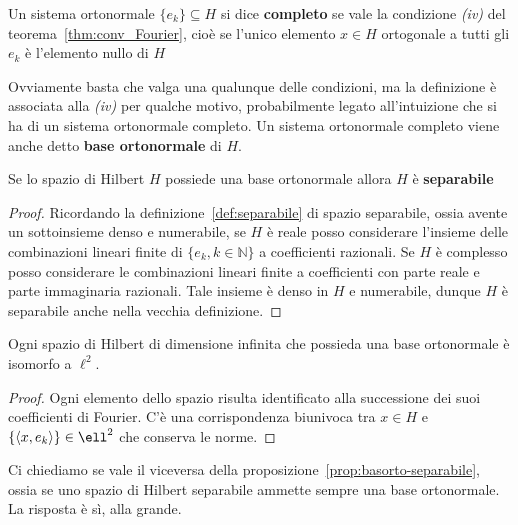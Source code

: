 \begin{definition}
    Un sistema ortonormale \(\{e_{k}\} \subseteq H \) si dice \textbf{completo}
    se vale la condizione \textit{(iv)} del teorema~\ref{thm:conv_Fourier}, cioè
    se l'unico elemento \(x \in H\) ortogonale a tutti gli \(e_{k}\) è
    l'elemento nullo di \(H\) 
\end{definition}
Ovviamente basta che valga una qualunque delle condizioni, ma la definizione è
associata alla \textit{(iv)} per qualche motivo, probabilmente legato all'intuizione 
che si ha di un sistema ortonormale completo. Un sistema ortonormale completo
viene anche detto \textbf{base ortonormale} di \(H\).
\begin{proposition}\label{prop:basorto-separabile}
Se lo spazio di Hilbert \(H\) possiede una base ortonormale allora \(H\) è
\textbf{separabile}
\end{proposition}
\begin{proof}
Ricordando la definizione~\ref{def:separabile} di spazio separabile, ossia
avente un sottoinsieme denso e numerabile, se \(H\) è reale posso considerare
l'insieme delle combinazioni lineari finite di \(\{e_{k}, k \in \mathbb{N}\} \)
a coefficienti razionali. Se \(H\) è complesso posso considerare le combinazioni
lineari finite a coefficienti con parte reale e parte immaginaria razionali.
Tale insieme è denso in \(H\) e numerabile, dunque \(H\) è separabile anche
nella vecchia definizione. %
\end{proof}

\begin{proposition}\label{prop:isomorfol2}
    Ogni spazio di Hilbert di dimensione infinita che possieda una base ortonormale
    è isomorfo a \(\ell^2\). 
\end{proposition}
\begin{proof}
    Ogni elemento dello spazio risulta identificato
    alla successione dei suoi coefficienti di Fourier. C'è una corrispondenza
    biunivoca tra \(x \in H\) e \(\{\Span{x, e_{k}}\} \in \ell^2\) che conserva
    le norme.
\end{proof}

Ci chiediamo se vale il viceversa della
proposizione~\ref{prop:basorto-separabile}, ossia se uno spazio di Hilbert
separabile ammette sempre una base ortonormale. La risposta è sì, alla grande.

